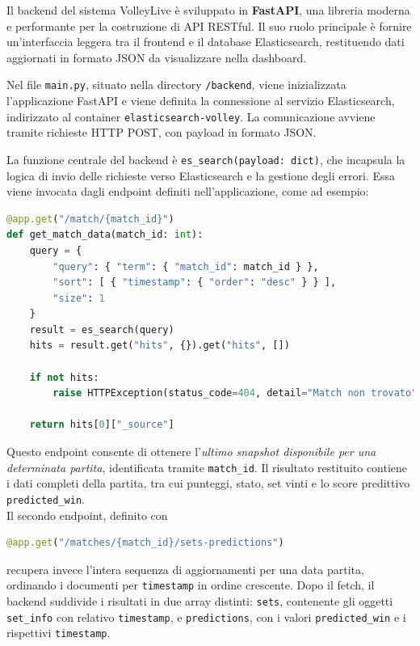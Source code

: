 \documentclass[a4paper,12pt]{report}
\begin{document}
Il backend del sistema VolleyLive è sviluppato in \textbf{FastAPI}, una libreria moderna e performante per la costruzione di API RESTful. Il suo ruolo principale è fornire un’interfaccia leggera tra il frontend e il database Elasticsearch, restituendo dati aggiornati in formato JSON da visualizzare nella dashboard.

Nel file \texttt{main.py}, situato nella directory \texttt{/backend}, viene inizializzata l’applicazione FastAPI e viene definita la connessione al servizio Elasticsearch, indirizzato al container \texttt{elasticsearch-volley}. La comunicazione avviene tramite richieste HTTP POST, con payload in formato JSON.

La funzione centrale del backend è \texttt{es\_search(payload: dict)}, che incapsula la logica di invio delle richieste verso Elasticsearch e la gestione degli errori. Essa viene invocata dagli endpoint definiti nell’applicazione, come ad esempio:

\begin{lstlisting}[language=Python]
@app.get("/match/{match_id}")
def get_match_data(match_id: int):
    query = {
        "query": { "term": { "match_id": match_id } },
        "sort": [ { "timestamp": { "order": "desc" } } ],
        "size": 1
    }
    result = es_search(query)
    hits = result.get("hits", {}).get("hits", [])

    if not hits:
        raise HTTPException(status_code=404, detail="Match non trovato")

    return hits[0]["_source"]
\end{lstlisting}

Questo endpoint consente di ottenere l’\textit{ultimo snapshot disponibile per una determinata partita}, identificata tramite \texttt{match\_id}. Il risultato restituito contiene i dati completi della partita, tra cui punteggi, stato, set vinti e lo score predittivo \texttt{predicted\_win}.
\\

Il secondo endpoint, definito con

\begin{lstlisting}[language=Python]
@app.get("/matches/{match_id}/sets-predictions")
\end{lstlisting}

recupera invece l’intera sequenza di aggiornamenti per una data partita, ordinando i documenti per \texttt{timestamp} in ordine crescente. Dopo il fetch, il backend suddivide i risultati in due array distinti: \texttt{sets}, contenente gli oggetti \texttt{set\_info} con relativo \texttt{timestamp}, e \texttt{predictions}, con i valori \texttt{predicted\_win} e i rispettivi \texttt{timestamp}.
\end{document}
